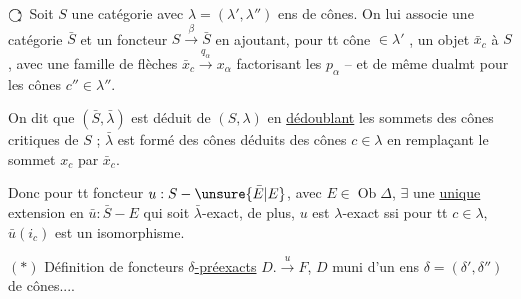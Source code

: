 

\margin{$\cdot\!\cdot\quad\cdot\ \cdot$}

$\bigcirc\!\!\!{\scriptstyle\genfrac{}{}{0pt}{}{*}{*}}$ Soit $S$ une catégorie avec $\lambda=(\lambda',\lambda'')$ ens de cônes. On lui associe une catégorie $\bar S$ et un foncteur $S\xrightarrow{\beta}\bar S$   en ajoutant, pour tt  cône  $\in\lambda'$ , un objet $\bar x_c$ à $S$, avec   une famille de flèches $\bar x_c\xrightarrow{q_\alpha}x_\alpha$ factorisant les $p_\alpha$ -- et de même dualmt pour les cônes $c''\in\lambda''$.

On dit que $(\bar S,\bar\lambda)$ est déduit de $(S,\lambda)$ en \uline{dédoublant} les sommets des cônes critiques de $S$ ; $\bar\lambda$ est formé des cônes déduits des cônes $c\in\lambda$ en remplaçant le sommet $x_c$ par $\bar x_c$.

Donc pour tt foncteur $u:S-\unsure{\bar E|E}$, avec $E\in\operatorname{Ob}\Delta$, $\exists$ une \uline{unique} extension en $\bar u:\bar S-E$ qui soit $\bar\lambda$-exact, de plus, $u$ est $\lambda$-exact ssi  pour tt $c\in\lambda$, $\bar u(i_c)$ est un isomorphisme.

$(*)$ Définition de foncteurs \uline{$\delta$-préexacts} $D.\xrightarrow{u}F$, $D$ muni d'un ens $\delta=(\delta',\delta'')$ de cônes....

